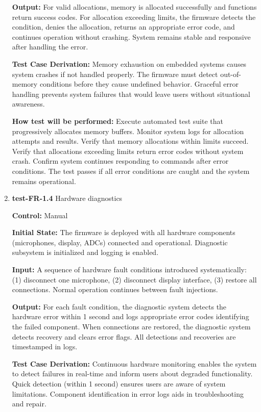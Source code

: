 \documentclass[12pt, titlepage]{article}
\begin{document}
\begin{enumerate}
\textbf{Output:}
For valid allocations, memory is allocated successfully and functions return 
success codes. For allocation exceeding limits, the firmware detects the 
condition, denies the allocation, returns an appropriate error code, and 
continues operation without crashing. System remains stable and responsive 
after handling the error.

\textbf{Test Case Derivation:} 
Memory exhaustion on embedded systems causes system crashes if not handled 
properly. The firmware must detect out-of-memory conditions before they cause 
undefined behavior. Graceful error handling prevents system failures that would 
leave users without situational awareness.
					
\textbf{How test will be performed:}
Execute automated test suite that progressively allocates memory buffers. Monitor 
system logs for allocation attempts and results. Verify that memory allocations 
within limits succeed. Verify that allocations exceeding limits return error 
codes without system crash. Confirm system continues responding to commands 
after error conditions. The test passes if all error conditions are caught and 
the system remains operational.

\item{\textbf{test-FR-1.4} Hardware diagnostics\\}

\textbf{Control:} Manual
					
\textbf{Initial State:} 
The firmware is deployed with all hardware components (microphones, display, 
ADCs) connected and operational. Diagnostic subsystem is initialized and logging 
is enabled.
					
\textbf{Input:}
A sequence of hardware fault conditions introduced systematically: (1) disconnect 
one microphone, (2) disconnect display interface, (3) restore all connections. 
Normal operation continues between fault injections.
					
\textbf{Output:}
For each fault condition, the diagnostic system detects the hardware error 
within 1 second and logs appropriate error codes identifying the failed 
component. When connections are restored, the diagnostic system detects recovery 
and clears error flags. All detections and recoveries are timestamped in logs.

\textbf{Test Case Derivation:} 
Continuous hardware monitoring enables the system to detect failures in real-time 
and inform users about degraded functionality. Quick detection (within 1 second) 
ensures users are aware of system limitations. Component identification in error 
logs aids in troubleshooting and repair.
					

\end{enumerate}
\end{document}
